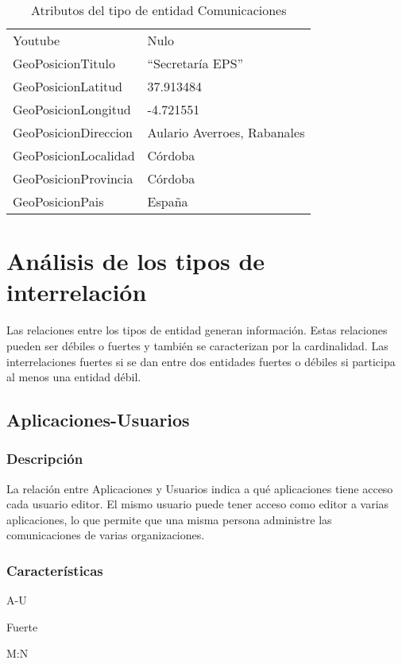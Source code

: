 \begin{table}[h!]
\begin{tabular}{|ll|}
        Youtube & Nulo \\
        GeoPosicionTitulo & ``Secretaría EPS'' \\
        GeoPosicionLatitud & 37.913484 \\
        GeoPosicionLongitud & -4.721551 \\
        GeoPosicionDireccion & Aulario Averroes, Rabanales \\
        GeoPosicionLocalidad & Córdoba \\
        GeoPosicionProvincia & Córdoba \\
        GeoPosicionPais & España \\
        \hline
    \end{tabular}%
    \caption{Atributos del tipo de entidad Comunicaciones}
    \label{cuadro:ejemplo-comunicacion}
\end{table}

\section {Análisis de los tipos de interrelación}
Las relaciones entre los tipos de entidad generan información. Estas relaciones pueden ser débiles o fuertes y también se caracterizan por la cardinalidad.
Las interrelaciones fuertes si se dan entre dos entidades fuertes o débiles si participa al menos una entidad débil.


\subsection{Aplicaciones-Usuarios}
\subsubsection*{Descripción}
La relación entre Aplicaciones y Usuarios indica a qué aplicaciones tiene acceso cada usuario editor. El mismo usuario puede tener acceso como editor a varias aplicaciones, lo que permite que una misma persona administre las comunicaciones de varias organizaciones.

\subsubsection*{Características}
\begin{description}[nosep,style=multiline,labelindent=0.8cm,leftmargin=4.5cm,font=\normalfont]
    \item[Nombre] A-U
    \item[Tipo] Fuerte
    \item[Cardinalidad] M:N
\end{description}
